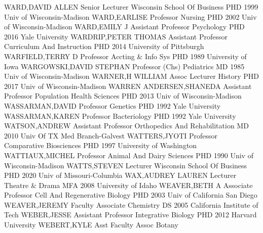 \documentclass[
]{article}
\begin{document}
\textbar WARD,DAVID ALLEN \textbar Senior Lecturer \textbar Wisconsin
School Of Business \textbar PHD 1999 Univ of Wisconsin-Madison
\textbar{}  \textbar WARD,EARLISE \textbar Professor
\textbar Nursing \textbar PHD 2002 Univ of Wisconsin-Madison \textbar{}
 \textbar WARD,EMILY J \textbar Assistant Professor
\textbar Psychology \textbar PHD 2016 Yale University \textbar{}
 \textbar WARDRIP,PETER THOMAS \textbar Assistant Professor
\textbar Curriculum And Instruction \textbar PHD 2014 University of
Pittsburgh \textbar{}  \textbar WARFIELD,TERRY D
\textbar Professor \textbar Accting \& Info Sys \textbar PHD 1989
University of Iowa \textbar{}  \textbar WARGOWSKI,DAVID
STEPHAN \textbar Professor (Chs) \textbar Pediatrics \textbar MD 1985
Univ of Wisconsin-Madison \textbar{}  \textbar WARNER,H
WILLIAM \textbar Assoc Lecturer \textbar History \textbar PHD 2017 Univ
of Wisconsin-Madison \textbar{}  \textbar WARREN
ANDERSEN,SHANEDA \textbar Assistant Professor \textbar Population Health
Sciences \textbar PHD 2013 Univ of Wisconsin-Madison \textbar{}
 \textbar WASSARMAN,DAVID \textbar Professor
\textbar Genetics \textbar PHD 1992 Yale University \textbar{}
 \textbar WASSARMAN,KAREN \textbar Professor
\textbar Bacteriology \textbar PHD 1992 Yale University \textbar{}
 \textbar WATSON,ANDREW \textbar Assistant Professor
\textbar Orthopedics And Rehabilitation \textbar MD 2010 Univ Of TX Med
Branch-Galvest \textbar{}  \textbar WATTERS,JYOTI
\textbar Professor \textbar Comparative Biosciences \textbar PHD 1997
University of Washington \textbar{} 
\textbar WATTIAUX,MICHEL \textbar Professor \textbar Animal And Dairy
Sciences \textbar PHD 1990 Univ of Wisconsin-Madison \textbar{}
 \textbar WATTS,STEVEN \textbar Lecturer \textbar Wisconsin
School Of Business \textbar PHD 2020 Univ of Missouri-Columbia
\textbar{}  \textbar WAX,AUDREY LAUREN \textbar Lecturer
\textbar Theatre \& Drama \textbar MFA 2008 University of Idaho
\textbar{}  \textbar WEAVER,BETH A \textbar Associate
Professor \textbar Cell And Regenerative Biology \textbar PHD 2003 Univ
of California San Diego \textbar{}  \textbar WEAVER,JEREMY
\textbar Faculty Associate \textbar Chemistry \textbar DS 2005
California Institute of Tech \textbar{} 
\textbar WEBER,JESSE \textbar Assistant Professor \textbar Integrative
Biology \textbar PHD 2012 Harvard University \textbar{} 
\textbar WEBERT,KYLE \textbar Asst Faculty Assoc \textbar Botany
\end{document}
